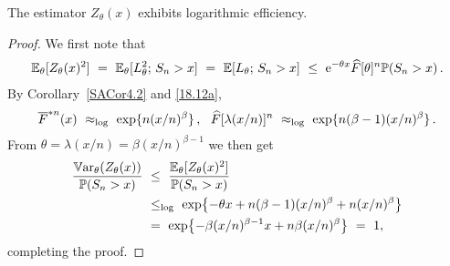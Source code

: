 \begin{proposition}\label{Prop:PL}
The estimator $Z_\theta(x)$ exhibits logarithmic efficiency.
\end{proposition}
\begin{proof}
We first note that
\begin{align*}
 \mathbb{E}_\theta[ Z_\theta(x)^2 ]\ =\ \mathbb{E}_\theta[L_\theta^2;\,S_n>x]
 \ =\ \mathbb{E}[L_\theta;\,S_n>x]\ \le\ \mathrm{e}^{-\theta x } \widehat F[\theta]^n  \mathbb{P}(S_n > x)\,.
\end{align*}
By Corollary~\ref{SACor4.2} and \eqref{18.12a},
\[\overline F^{*n}(x)\ \approx_{\log}\ \exp \{ n(x/n)^\beta \}\,,\ \  \widehat{F}[\lambda(x/n)]^{n}\ \approx_{\log}\ \exp \{ n(\beta-1)(x/n)^\beta \} \,.\]
From $\theta=\lambda(x/n)=\beta (x/n)^{\beta-1}$ we then get
\begin{align*}\frac{ \Var_{\theta}(Z_\theta(x)) }{ \Prob(S_n>x) }\ &\le\ 
\frac{ \Exp_\theta[ Z_\theta(x)^2 ] }{ \Prob(S_n>x) }\\ &\le_{\log}\ 
\exp\bigl\{-\theta x + n(\beta-1)(x/n)^\beta + n (x/n)^{\beta}\bigr\} \\
&=\ \exp\bigl\{-\beta (x/n)^{\beta-1} x + n\beta(x/n)^\beta\bigr\} \ =\  1, 
\end{align*}
completing the proof.
\end{proof}

